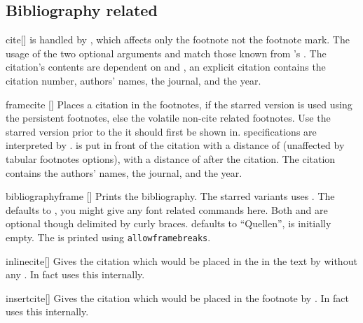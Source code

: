 \subsection{Bibliography related}
\begin{describemacro}{cite}[]
   is handled by , which affects only the footnote not
  the footnote mark. The usage of the two optional arguments and 
  match those known from 's . The citation's contents are
  dependent on  and , an explicit
  citation contains the citation number, authors' names, the journal, and the
  year.
\end{describemacro}

\begin{describemacro}{framecite}%
  [\meta{*}]
  Places a citation in the footnotes, if the starred version is used using the
  persistent footnotes, else the volatile non-cite related footnotes. Use the
  starred version prior to the  it should first be shown in.
   specifications are interpreted by .  is
  put in front of the citation with a distance of \cs{,} (unaffected by tabular
  footnotes options),  with a distance of \cs{,} after the citation.
  The citation contains the authors' names, the journal, and the year.
\end{describemacro}

\begin{describemacro}{bibliographyframe}%
  [\meta{*}]
  Prints the bibliography. The starred variants uses . The
   defaults to , you might give any font related
  commands here. Both  and  are optional though
  delimited by curly braces.  defaults to \enquote{Quellen},
   is initially empty. The  is printed
  using \texttt{allowframebreaks}.
\end{describemacro}

\begin{describemacro}{inlinecite}[]
  Gives the citation which would be placed in the in the text by 
  without any . In fact  uses this internally.
\end{describemacro}

\begin{describemacro}{insertcite}[]
  Gives the citation which would be placed in the footnote by . In fact
   uses this internally.
\end{describemacro}

